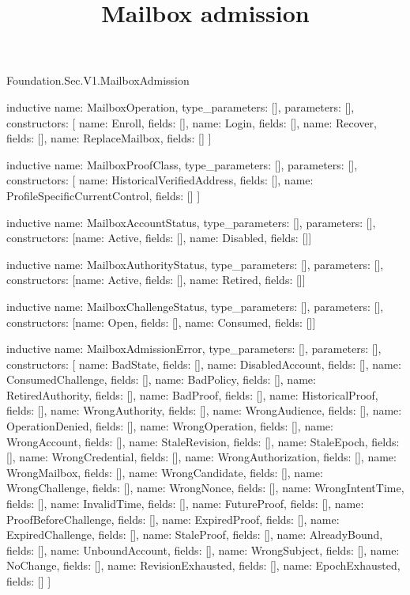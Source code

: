 \begin{lexlean}{Foundation.Sec.V1.MailboxAdmission}
\title{Mailbox admission}
\begin{semanticmodule}
inductive{
  name: MailboxOperation,
  type_parameters: [],
  parameters: [],
  constructors: [
    {name: Enroll, fields: []},
    {name: Login, fields: []},
    {name: Recover, fields: []},
    {name: ReplaceMailbox, fields: []}
  ]
}

inductive{
  name: MailboxProofClass,
  type_parameters: [],
  parameters: [],
  constructors: [
    {name: HistoricalVerifiedAddress, fields: []},
    {name: ProfileSpecificCurrentControl, fields: []}
  ]
}

inductive{
  name: MailboxAccountStatus,
  type_parameters: [],
  parameters: [],
  constructors: [{name: Active, fields: []}, {name: Disabled, fields: []}]
}

inductive{
  name: MailboxAuthorityStatus,
  type_parameters: [],
  parameters: [],
  constructors: [{name: Active, fields: []}, {name: Retired, fields: []}]
}

inductive{
  name: MailboxChallengeStatus,
  type_parameters: [],
  parameters: [],
  constructors: [{name: Open, fields: []}, {name: Consumed, fields: []}]
}

inductive{
  name: MailboxAdmissionError,
  type_parameters: [],
  parameters: [],
  constructors: [
    {name: BadState, fields: []},
    {name: DisabledAccount, fields: []},
    {name: ConsumedChallenge, fields: []},
    {name: BadPolicy, fields: []},
    {name: RetiredAuthority, fields: []},
    {name: BadProof, fields: []},
    {name: HistoricalProof, fields: []},
    {name: WrongAuthority, fields: []},
    {name: WrongAudience, fields: []},
    {name: OperationDenied, fields: []},
    {name: WrongOperation, fields: []},
    {name: WrongAccount, fields: []},
    {name: StaleRevision, fields: []},
    {name: StaleEpoch, fields: []},
    {name: WrongCredential, fields: []},
    {name: WrongAuthorization, fields: []},
    {name: WrongMailbox, fields: []},
    {name: WrongCandidate, fields: []},
    {name: WrongChallenge, fields: []},
    {name: WrongNonce, fields: []},
    {name: WrongIntentTime, fields: []},
    {name: InvalidTime, fields: []},
    {name: FutureProof, fields: []},
    {name: ProofBeforeChallenge, fields: []},
    {name: ExpiredProof, fields: []},
    {name: ExpiredChallenge, fields: []},
    {name: StaleProof, fields: []},
    {name: AlreadyBound, fields: []},
    {name: UnboundAccount, fields: []},
    {name: WrongSubject, fields: []},
    {name: NoChange, fields: []},
    {name: RevisionExhausted, fields: []},
    {name: EpochExhausted, fields: []}
  ]
}


\end{semanticmodule}
\end{lexlean}
